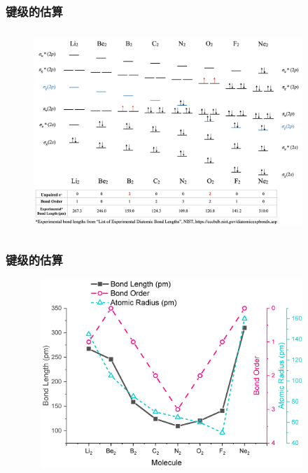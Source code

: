 \frame
{
	\frametitle{键级的估算}
\begin{figure}[h!]
\centering
\vspace{-10.5pt}
\includegraphics[height=3.00in,width=4.00in,viewport=0 0 1500 1050,clip]{Figures/Band-order.png}
\label{Bond_Order}
\end{figure}
}

\frame
{
	\frametitle{键级的估算}
\begin{figure}[h!]
\centering
\vspace{-15.5pt}
\includegraphics[height=2.80in,width=4.10in,viewport=0 0 800 550,clip]{Figures/Band-order-2.jpg}
\label{Bond_Order-2}
\end{figure}
}

